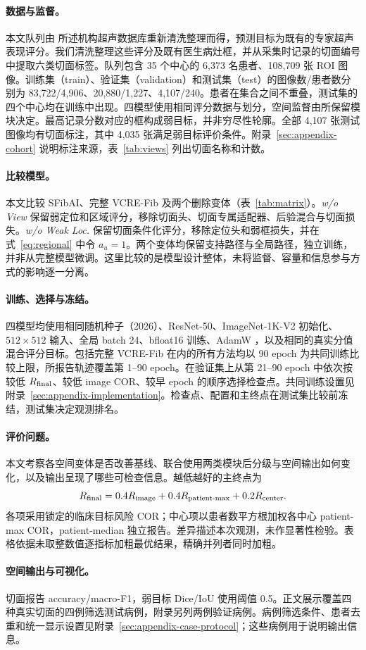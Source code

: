 \paragraph{数据与监督。}
本文队列由 \citet{xu2026sfibai} 所述机构超声数据库重新清洗整理而得，预测目标为既有的专家超声表现评分。我们清洗整理这些评分及既有医生病灶框，并从采集时记录的切面编号中提取六类切面标签。队列包含 35 个中心的 6,373 名患者、108,709 张 ROI 图像。训练集（train）、验证集（validation）和测试集（test）的图像数/患者数分别为 83,722/4,906、20,880/1,227、4,107/240。患者在集合之间不重叠，测试集的四个中心均在训练中出现。四模型使用相同评分数据与划分，空间监督由所保留模块决定。最高记录分数对应的框构成弱目标，并非穷尽性轮廓。全部 4,107 张测试图像均有切面标注，其中 4,035 张满足弱目标评价条件。附录~\ref{sec:appendix-cohort} 说明标注来源，表~\ref{tab:views} 列出切面名称和计数。

\paragraph{比较模型。}
本文比较 SFibAI、完整 VCRE-Fib 及两个删除变体（表~\ref{tab:matrix}）。\emph{w/o View} 保留弱定位和区域评分，移除切面头、切面专属适配器、后验混合与切面损失。\emph{w/o Weak Loc.} 保留切面条件化评分，移除定位头和弱框损失，并在式~\ref{eq:regional} 中令 $a_u=1$。两个变体均保留支持路径与全局路径，独立训练，并非从完整模型微调。这里比较的是模型设计整体，未将监督、容量和信息参与方式的影响逐一分离。

\paragraph{训练、选择与冻结。}
四模型均使用相同随机种子（2026）、ResNet-50、ImageNet-1K-V2 初始化、$512\times512$ 输入、全局 batch 24、bfloat16 训练、AdamW \citep{loshchilov2019adamw}，以及相同的真实分值混合评分目标。包括完整 VCRE-Fib 在内的所有方法均以 90 epoch 为共同训练比较上限，所报告轨迹覆盖第 1--90 epoch。在验证集上从第 21--90 epoch 中依次按较低 $R_{\mathrm{final}}$、较低 image COR、较早 epoch 的顺序选择检查点。共同训练设置见附录~\ref{sec:appendix-implementation}。检查点、配置和主终点在测试集比较前冻结，测试集决定观测排名。

\paragraph{评价问题。}
本文考察各空间变体是否改善基线、联合使用两类模块后分级与空间输出如何变化，以及输出呈现了哪些可检查信息。越低越好的主终点为
\begin{equation}
R_{\mathrm{final}}=0.4R_{\mathrm{image}}+0.4R_{\mathrm{patient\text{-}max}}+0.2R_{\mathrm{center}} .
\label{eq:risk}
\end{equation}
各项采用锁定的临床目标风险 COR；中心项以患者数平方根加权各中心 patient-max COR，patient-median 独立报告。差异描述本次观测，未作显著性检验。表格依据未取整数值逐指标加粗最优结果，精确并列者同时加粗。

\paragraph{空间输出与可视化。}
切面报告 accuracy/macro-F1，弱目标 Dice/IoU 使用阈值 0.5。正文展示覆盖四种真实切面的四例筛选测试病例，附录另列两例验证病例。病例筛选条件、患者去重和统一显示设置见附录~\ref{sec:appendix-case-protocol}；这些病例用于说明输出信息。

